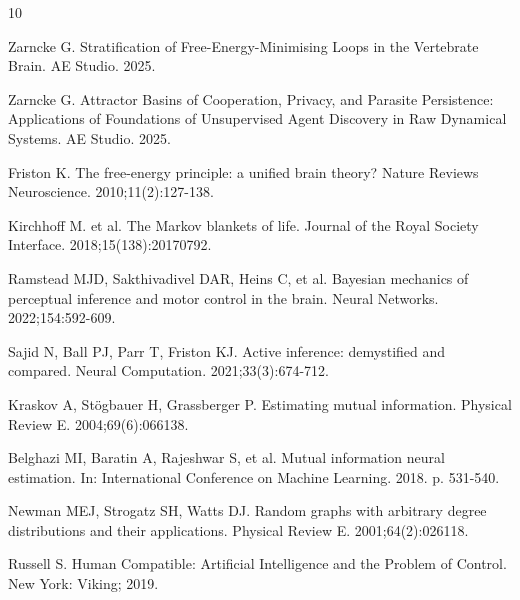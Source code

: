 \documentclass[10pt,conference]{IEEEtran}
\begin{document}

\begin{thebibliography}{10}

 Zarncke G. Stratification of Free-Energy-Minimising Loops in the Vertebrate Brain. AE Studio. 2025.

 Zarncke G. Attractor Basins of Cooperation, Privacy, and Parasite Persistence: Applications of Foundations of Unsupervised Agent Discovery in Raw Dynamical Systems. AE Studio. 2025.

 Friston K. The free-energy principle: a unified brain theory? Nature Reviews Neuroscience. 2010;11(2):127-138.

 Kirchhoff M. et al. The Markov blankets of life. Journal of the Royal Society Interface. 2018;15(138):20170792.

 Ramstead MJD, Sakthivadivel DAR, Heins C, et al. Bayesian mechanics of perceptual inference and motor control in the brain. Neural Networks. 2022;154:592-609.

 Sajid N, Ball PJ, Parr T, Friston KJ. Active inference: demystified and compared. Neural Computation. 2021;33(3):674-712.

 Kraskov A, Stögbauer H, Grassberger P. Estimating mutual information. Physical Review E. 2004;69(6):066138.

 Belghazi MI, Baratin A, Rajeshwar S, et al. Mutual information neural estimation. In: International Conference on Machine Learning. 2018. p. 531-540.

 Newman MEJ, Strogatz SH, Watts DJ. Random graphs with arbitrary degree distributions and their applications. Physical Review E. 2001;64(2):026118.

 Russell S. Human Compatible: Artificial Intelligence and the Problem of Control. New York: Viking; 2019.

\end{thebibliography}
\end{document}
